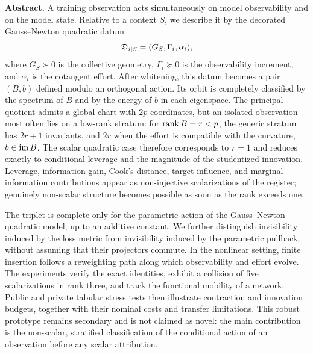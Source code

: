 \begin{abstractbox}
\small
\textbf{Abstract.} A training observation acts simultaneously on model observability and on the model state. Relative to a context $S$, we describe it by the decorated Gauss--Newton quadratic datum
\[
\mathfrak D_{i\mid S}=(G_S,\Gamma_i,\alpha_i),
\]
where $G_S\succ0$ is the collective geometry, $\Gamma_i\succeq0$ is the observability increment, and $\alpha_i$ is the cotangent effort. After whitening, this datum becomes a pair $(B,b)$ defined modulo an orthogonal action. Its orbit is completely classified by the spectrum of $B$ and by the energy of $b$ in each eigenspace. The principal quotient admits a global chart with $2p$ coordinates, but an isolated observation most often lies on a low-rank stratum: for $\operatorname{rank} B=r<p$, the generic stratum has $2r+1$ invariants, and $2r$ when the effort is compatible with the curvature, $b\in\operatorname{im} B$. The scalar quadratic case therefore corresponds to $r=1$ and reduces exactly to conditional leverage and the magnitude of the studentized innovation. Leverage, information gain, Cook's distance, target influence, and marginal information contributions appear as non-injective scalarizations of the register; genuinely non-scalar structure becomes possible as soon as the rank exceeds one.

The triplet is complete only for the parametric action of the Gauss--Newton quadratic model, up to an additive constant. We further distinguish invisibility induced by the loss metric from invisibility induced by the parametric pullback, without assuming that their projectors commute. In the nonlinear setting, finite insertion follows a reweighting path along which observability and effort evolve. The experiments verify the exact identities, exhibit a collision of five scalarizations in rank three, and track the functional mobility of a network. Public and private tabular stress tests then illustrate contraction and innovation budgets, together with their nominal costs and transfer limitations. This robust prototype remains secondary and is not claimed as novel: the main contribution is the non-scalar, stratified classification of the conditional action of an observation before any scalar attribution.
\end{abstractbox}

\clearpage
\hypersetup{pageanchor=true}
\setcounter{tocdepth}{1}
\tableofcontents
\clearpage

